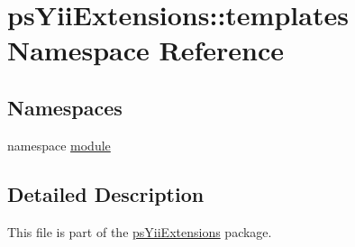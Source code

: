 \hypertarget{namespacepsYiiExtensions_1_1templates}{
\section{psYiiExtensions::templates Namespace Reference}
\label{namespacepsYiiExtensions_1_1templates}
}
\subsection*{Namespaces}
\begin{DoxyCompactItemize}
\item 
namespace \hyperlink{namespacepsYiiExtensions_1_1templates_1_1module}{module}
\end{DoxyCompactItemize}


\subsection{Detailed Description}
This file is part of the \hyperlink{namespacepsYiiExtensions}{psYiiExtensions} package.

